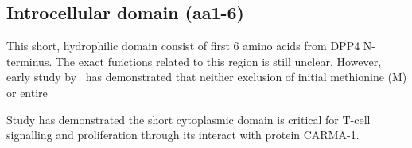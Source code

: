 \subsection{Introcellular domain (aa1-6)}

This short, hydrophilic domain consist of first 6 amino acids from DPP4 N-terminus. The exact functions related to this region is still unclear. However, early study by~\citet{Hong1990} has demonstrated that neither exclusion of initial methionine (M) or entire

Study has demonstrated the short cytoplasmic domain is critical for T-cell signalling and proliferation through its interact with protein CARMA-1. \cite{Ohnuma_2007}